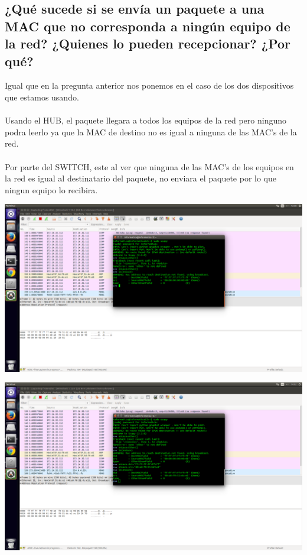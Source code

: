 \documentclass[spanish]{udpreport}
\begin{document}
\subsection{¿Qué sucede si se envía un paquete a una MAC que no corresponda a ningún equipo
de la red? ¿Quienes lo pueden recepcionar? ¿Por qué?}

Igual que en la pregunta anterior  nos ponemos en el caso de los dos dispositivos que estamos usando. \\\\
Usando el HUB, el paquete llegara a todos los equipos de la red pero ninguno podra leerlo ya que la MAC de destino no es igual a ninguna de las MAC's de la red.\\\\
Por parte del SWITCH, este al ver que ninguna de las MAC's de los equipos en la red es igual al destinatario del paquete, no enviara el paquete por lo que ningun equipo lo recibira.



\includegraphics[scale=0.2]{fotos/1.png}


\includegraphics[scale=0.2]{fotos/2.png}
\end{document}

